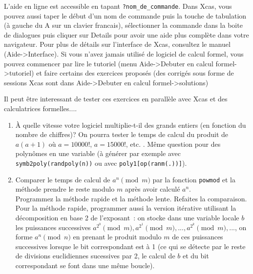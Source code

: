 \documentclass[a4paper,11pt]{book}
\begin{document}
\begin{giacjshere}

L'aide en ligne est accessible en tapant \verb|?nom_de_commande|.
Dans Xcas, vous pouvez aussi taper le d\'ebut d'un
nom de commande puis la touche de tabulation (\`a gauche du A sur
un clavier francais), s\'electionner la commande dans la boite
de dialogues puis cliquer sur Details pour avoir une aide plus
compl\`ete dans votre navigateur. Pour plus de d\'etails sur
l'interface de Xcas, consultez le manuel (Aide->Interface).
Si vous n'avez jamais utilis\'e de logiciel de calcul formel,
vous pouvez commencer par lire le tutoriel (menu Aide->Debuter en
calcul formel->tutoriel) et faire certains des exercices 
propos\'es (des corrig\'es sous forme de sessions Xcas sont 
dans Aide->Debuter en calcul formel->solutions)

Il peut \^etre interessant de tester ces exercices
en parall\`ele avec Xcas et des calculatrices
formelles....

\begin{enumerate}
\item \`A quelle vitesse votre logiciel multiplie-t-il des
grands entiers (en fonction du nombre de chiffres)? 
On pourra tester le temps de calcul du produit
de $a(a+1)$ o\`u $a=10 000!$, $a=15000!$, etc. .
M\^eme question pour des polyn\^omes en une variable (\`a g\'en\'erer
par exemple avec \verb|symb2poly(randpoly(n))| ou avec \verb|poly1[op(ranm(.))]|).
\item Comparer le temps de calcul de $a^n \pmod m$ par la fonction
\verb|powmod| et la m\'ethode prendre le reste modulo $m$ apr\`es avoir 
calcul\'e $a^n$.\\
Programmez la m\'ethode rapide et la m\'ethode lente.
Refaites la
comparaison. Pour la m\'ethode rapide, programmer aussi la version
it\'erative utilisant la d\'ecomposition en base 2 de l'exposant~:
on stocke dans une variable locale $b$ les puissances successives
$a^{2^0} \pmod m,a^{2^1} \pmod m, ..., a^{2^k} \pmod m, ...$,
on forme $a^n \pmod n$ en prenant le produit modulo $m$ de ces puissances
successives lorsque le bit correspondant est \`a 1 (ce qui se
d\'etecte par le reste de divisions euclidiennes sucessives par 2, le
calcul de $b$ et du bit correspondant se font dans une m\^eme boucle).


\end{enumerate}
\end{giacjshere}
\end{document}
